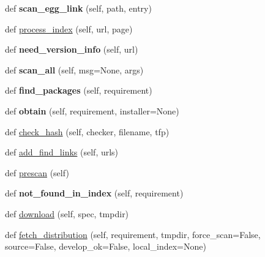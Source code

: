 \begin{DoxyCompactItemize}
def {\bfseries scan\+\_\+egg\+\_\+link} (self, path, entry)
\item 
def \hyperlink{classsetuptools_1_1package__index_1_1_package_index_a1ae14e5edd4b4c1a585aec3eb9022de0}{process\+\_\+index} (self, url, page)
\item 
\mbox{\label{classsetuptools_1_1package__index_1_1_package_index_af387b1796d6cf3a4542782cf936ee854}} 
def {\bfseries need\+\_\+version\+\_\+info} (self, url)
\item 
\mbox{\label{classsetuptools_1_1package__index_1_1_package_index_ae2e367f0243bea335a9fb9a86f77a668}} 
def {\bfseries scan\+\_\+all} (self, msg=None, args)
\item 
\mbox{\label{classsetuptools_1_1package__index_1_1_package_index_ac6b53cacdec1d717c42a4412cb0bc10f}} 
def {\bfseries find\+\_\+packages} (self, requirement)
\item 
\mbox{\label{classsetuptools_1_1package__index_1_1_package_index_aefcf6b14d54c909ce0200f666672acaf}} 
def {\bfseries obtain} (self, requirement, installer=None)
\item 
def \hyperlink{classsetuptools_1_1package__index_1_1_package_index_a1487a419c7370d7ac604a2f62e1e20a8}{check\+\_\+hash} (self, checker, filename, tfp)
\item 
def \hyperlink{classsetuptools_1_1package__index_1_1_package_index_af2814314197cc6aee392b64f303f08c4}{add\+\_\+find\+\_\+links} (self, urls)
\item 
def \hyperlink{classsetuptools_1_1package__index_1_1_package_index_a65d775034e7b39ede1a15be9cc17e1aa}{prescan} (self)
\item 
\mbox{\label{classsetuptools_1_1package__index_1_1_package_index_a368455ef8e28ab626077dce7ced8d44e}} 
def {\bfseries not\+\_\+found\+\_\+in\+\_\+index} (self, requirement)
\item 
def \hyperlink{classsetuptools_1_1package__index_1_1_package_index_a100de731e036d1fc5e9604355e02deed}{download} (self, spec, tmpdir)
\item 
def \hyperlink{classsetuptools_1_1package__index_1_1_package_index_a991bcc357db71bc05773ce3bb03c85a4}{fetch\+\_\+distribution} (self, requirement, tmpdir, force\+\_\+scan=False, source=False, develop\+\_\+ok=False, local\+\_\+index=None)

\end{DoxyCompactItemize}
